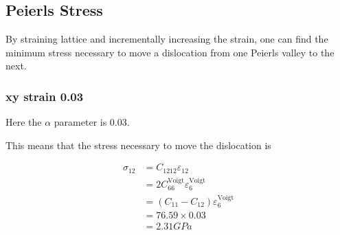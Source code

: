 \documentclass[11pt]{article}
\begin{document}
\subsection{Peierls Stress}
\label{sec:orgf7869bf}

By straining lattice and incrementally increasing the strain, one
can find the minimum stress necessary to move a dislocation from one
Peierls valley to the next. 

\subsubsection{xy strain 0.03}
\label{sec:org8acfd35}

Here the \(\alpha\) parameter is 0.03. 

This means that the stress necessary to move the dislocation is 

\begin{align*}
\sigma_{12} &= C_{1212}\varepsilon_{12} \\
    &= 2C^{\text{Voigt}}_{66 }\varepsilon_6^{\text{Voigt}} \\
    &= ( C_{11}- C_{12}) \varepsilon_6^{\text{Voigt}} \\
    &= 76.59 \times 0.03 \\ 
    &= 2.31 GPa\ 
\end{align*}
\end{document}
